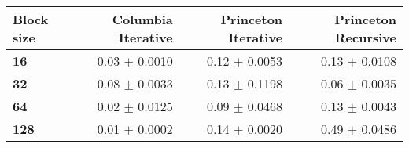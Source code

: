 \begin{tabular}{lrrr}\toprule
\textbf{Block size}  & \textbf{Columbia Iterative} & \textbf{Princeton Iterative} & \textbf{Princeton Recursive}\\\midrule
\textbf{16}  & 0.03 $\pm$ 0.0010 & 0.12 $\pm$ 0.0053 & 0.13 $\pm$ 0.0108\\
\textbf{32}  & 0.08 $\pm$ 0.0033 & 0.13 $\pm$ 0.1198 & 0.06 $\pm$ 0.0035\\
\textbf{64}  & 0.02 $\pm$ 0.0125 & 0.09 $\pm$ 0.0468 & 0.13 $\pm$ 0.0043\\
\textbf{128} & 0.01 $\pm$ 0.0002 & 0.14 $\pm$ 0.0020 & 0.49 $\pm$ 0.0486\\
\bottomrule
\end{tabular}
